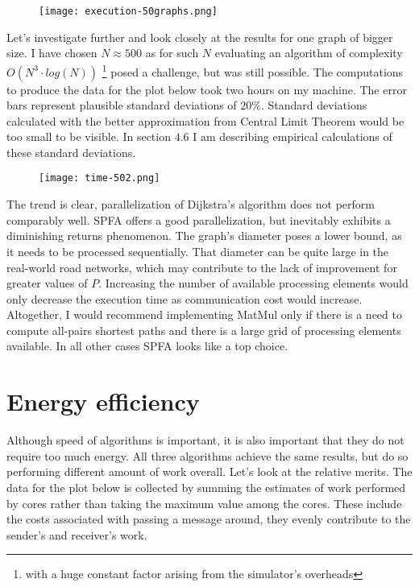 \documentclass[12pt,a4paper,oneside,openright]{report}
\begin{document}
\begin{figure}[h]
\texttt{[image: execution-50graphs.png]}
\end{figure}

Let's investigate further and look closely at the results for one graph of bigger size. I have chosen $N\approx 500$ as for such $N$ evaluating an algorithm of complexity $O(N^3\cdot log(N))$ \footnote{with a huge constant factor arising from the simulator's overheads} posed a challenge, but was still possible. The computations to produce the data for the plot below took two hours on my machine. The error bars represent plausible standard deviations of $20\%$. Standard deviations calculated with the better approximation from Central Limit Theorem would be too small to be visible. In section $4.6$ I am describing empirical calculations of these standard deviations.


\begin{figure}[h]
\centering
\texttt{[image: time-502.png]}
\end{figure}


The trend is clear, parallelization of Dijkstra's algorithm does not perform comparably well. SPFA offers a good parallelization, but inevitably exhibits a diminishing returns phenomenon. The graph's diameter poses a lower bound, as it needs to be processed sequentially. That diameter can be quite large in the real-world road networks, which may contribute to the lack of improvement for greater values of $P$. Increasing the number of available processing elements would only decrease the execution time as communication cost would increase. Altogether, I would recommend implementing MatMul only if there is a need to compute all-pairs shortest paths and there is a large grid of processing elements available. In all other cases SPFA looks like a top choice.

\section{Energy efficiency}
Although speed of algorithms is important, it is also important that they do not require too much energy. All three algorithms achieve the same results, but do so performing different amount of work overall. Let's look at the relative merits. The data for the plot below is collected by summing the estimates of work performed by cores rather than taking the maximum value among the cores. These include the costs associated with passing a message around, they evenly contribute to the sender's and receiver's work.
\end{document}
